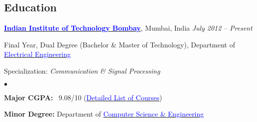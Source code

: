 \documentclass[margin,line]{res}
\newenvironment{list1}{
  \begin{list}{\ding{113}}{%
      \setlength{\itemsep}{0in}
      \setlength{\parsep}{0in} \setlength{\parskip}{0in}
      \setlength{\topsep}{0in} \setlength{\partopsep}{0in} 
      \setlength{\leftmargin}{0.17in}}}{\end{list}}
\newenvironment{list2}{
  \begin{list}{$\bullet$}{%
      \setlength{\itemsep}{0in}
      \setlength{\parsep}{0in} \setlength{\parskip}{0in}
      \setlength{\topsep}{0in} \setlength{\partopsep}{0in} 
      \setlength{\leftmargin}{0.2in}}}{\end{list}}
\begin{document}
\begin{resume}
\section{\sc Education}
{\bf \href{http://www.iitb.ac.in/}{\textcolor{blue}{Indian Institute of Technology Bombay}}}, Mumbai, India \hfill {\it July 2012 -- Present} \\
\vspace*{-.1in}
\begin{list1}
\item[] Final Year, Dual Degree (Bachelor \& Master of Technology), Department of \href{http://www.ee.iitb.ac.in/}{\textcolor{blue}{Electrical Engineering}}
\item[] Specialization: {\em Communication \& Signal Processing}
\begin{list2}
\vspace*{.05in}
\item \textbf{Major CGPA:}  \ 9.08/10 (\hyperlink{crselst}{\textcolor{blue}{Detailed List of Courses}})
\item \textbf{Minor Degree:}  Department of \href{http://www.cse.iitb.ac.in/}{\textcolor{blue}{Computer Science \& Engineering}}
\end{list2}
\end{list1}


\end{resume}
\end{document}
